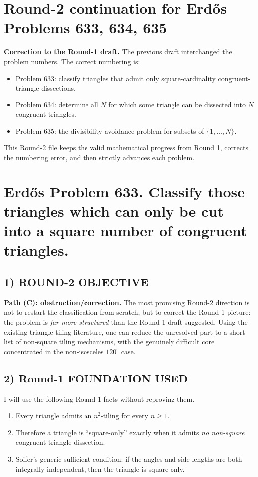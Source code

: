 \section*{Round-2 continuation for Erd\H{o}s Problems 633, 634, 635}

\noindent\textbf{Correction to the Round-1 draft.} The previous draft interchanged the problem numbers. The correct numbering is:
\begin{itemize}
\item Problem 633: classify triangles that admit only square-cardinality congruent-triangle dissections.
\item Problem 634: determine all $N$ for which some triangle can be dissected into $N$ congruent triangles.
\item Problem 635: the divisibility-avoidance problem for subsets of $\{1,\dots,N\}$.
\end{itemize}
This Round-2 file keeps the valid mathematical progress from Round 1, corrects the numbering error, and then strictly advances each problem.

\section*{Erd\H{o}s Problem 633. Classify those triangles which can only be cut into a square number of congruent triangles.}

\subsection*{1) ROUND-2 OBJECTIVE}
\textbf{Path (C): obstruction/correction.} The most promising Round-2 direction is not to restart the classification from scratch, but to correct the Round-1 picture: the problem is \emph{far more structured} than the Round-1 draft suggested. Using the existing triangle-tiling literature, one can reduce the unresolved part to a short list of non-square tiling mechanisms, with the genuinely difficult core concentrated in the non-isosceles $120^\circ$ case.

\subsection*{2) Round-1 FOUNDATION USED}
I will use the following Round-1 facts without reproving them.
\begin{enumerate}
\item Every triangle admits an $n^2$-tiling for every $n\ge 1$.
\item Therefore a triangle is ``square-only'' exactly when it admits \emph{no non-square} congruent-triangle dissection.
\item Soifer's generic sufficient condition: if the angles and side lengths are both integrally independent, then the triangle is square-only.
\end{enumerate}


